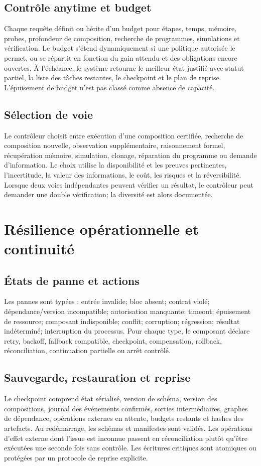 \documentclass[11pt,a4paper]{article}
\begin{document}
\subsection{Contrôle anytime et budget}
Chaque requête définit ou hérite d'un budget pour étapes, temps, mémoire, probes, profondeur de composition, recherche de programmes, simulations et vérification. Le budget s'étend dynamiquement si une politique autorisée le permet, ou se répartit en fonction du gain attendu et des obligations encore ouvertes. À l'échéance, le système retourne le meilleur état justifié avec statut partiel, la liste des tâches restantes, le checkpoint et le plan de reprise. L'épuisement de budget n'est pas classé comme absence de capacité.

\subsection{Sélection de voie}
Le contrôleur choisit entre exécution d'une composition certifiée, recherche de composition nouvelle, observation supplémentaire, raisonnement formel, récupération mémoire, simulation, clonage, réparation du programme ou demande d'information. Le choix utilise la disponibilité et les preuves pertinentes, l'incertitude, la valeur des informations, le coût, les risques et la réversibilité. Lorsque deux voies indépendantes peuvent vérifier un résultat, le contrôleur peut demander une double vérification; la diversité est alors documentée.

\section{Résilience opérationnelle et continuité}
\subsection{États de panne et actions}
Les pannes sont typées : entrée invalide; bloc absent; contrat violé; dépendance/version incompatible; autorisation manquante; timeout; épuisement de ressource; composant indisponible; conflit; corruption; régression; résultat indéterminé; interruption du processus. Pour chaque type, le composant déclare retry, backoff, fallback compatible, checkpoint, compensation, rollback, réconciliation, continuation partielle ou arrêt contrôlé.

\subsection{Sauvegarde, restauration et reprise}
Le checkpoint comprend état sérialisé, version de schéma, version des compositions, journal des événements confirmés, sorties intermédiaires, graphes de dépendance, opérations externes en attente, budgets restants et hashes des artefacts. Au redémarrage, les schémas et manifestes sont validés. Les opérations d'effet externe dont l'issue est inconnue passent en réconciliation plutôt qu'être exécutées une seconde fois sans contrôle. Les écritures critiques sont atomiques ou protégées par un protocole de reprise explicite.
\end{document}
